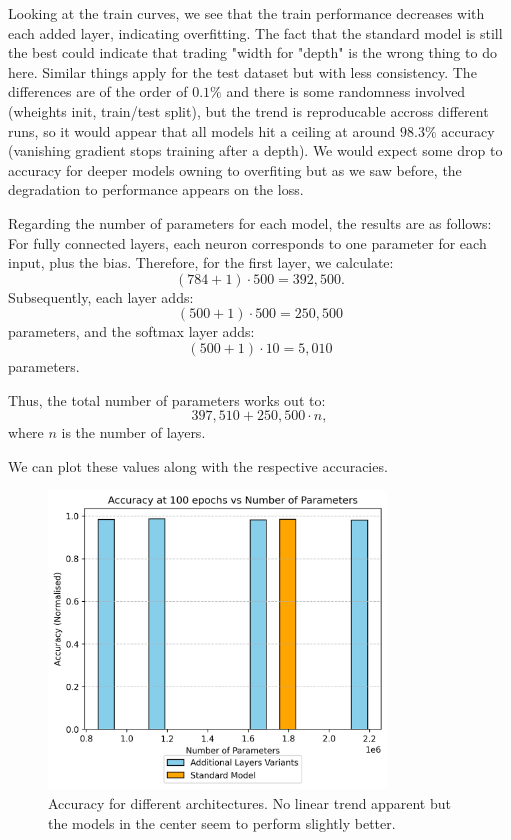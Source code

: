 \documentclass{article}
\begin{document}
Looking at the train curves, we see that the train performance decreases with each added layer, indicating overfitting.
The fact that the standard model is still the best could indicate that trading "width for "depth" is the wrong thing to do here.
Similar things apply for the test dataset but with less consistency.
The differences are of the order of \(0.1\% \) and there is some randomness involved (wheights init, train/test split), but the trend is reproducable accross different runs, so it would appear that all models hit a ceiling at around \(98.3\%\) accuracy (vanishing gradient stops training after a depth).
We would expect some drop to accuracy for deeper models owning to overfiting but as we saw before, the degradation to performance appears on the loss.

Regarding the number of parameters for each model, the results are as follows:
For fully connected layers, each neuron corresponds to one parameter for each input, plus the bias. Therefore, for the first layer, we calculate:
\[
(784+1) \cdot 500 = 392,500.
\]
Subsequently, each layer adds:
\[
(500+1) \cdot 500 = 250,500
\]
parameters, and the softmax layer adds:
\[
(500+1) \cdot 10 = 5,010
\]
parameters. 

Thus, the total number of parameters works out to:
\[
397,510 + 250,500 \cdot n,
\]
where \(n\) is the number of layers.

We can plot these values along with the respective accuracies.

\begin{figure}[h!]
    \centering
    \includegraphics[width=0.8\textwidth]{./plots/plot11.png}
    \caption{Accuracy for different architectures. No linear trend apparent but the models in the center seem to perform slightly better.}
    \label{fig:plot9}
\end{figure}
\end{document}
